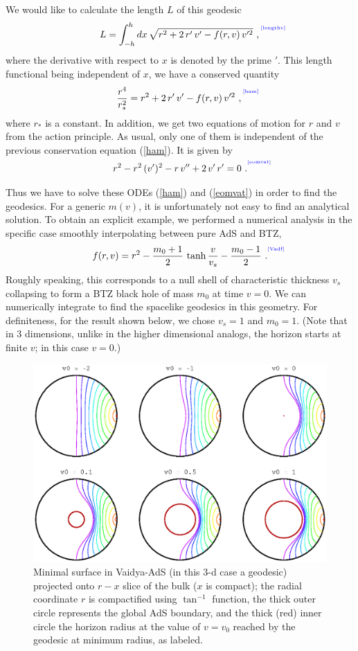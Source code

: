 \documentclass[12pt]{article}
\newcommand{\be}{\begin{equation}}
\newcommand{\ee}{\end{equation}}
\def\req#1{(\ref{#1})}
\def\s{\sigma}
\def\f#1#2{{\frac{#1}{#2}}}
\def\f#1#2{{\frac{#1}{#2}}}
\def\Label#1{\label{#1}%
{ \color{blue}{\smash{\hbox to0pt{\raise2ex\hbox{\tiny[#1]}\hss}}}}}
\def\s{\sqrt}
\def\f {\frac}
\begin{document}
We would like to calculate the length $L$ of this geodesic
%
\be
L=\int^{h}_{-h} dx \,\s{r^2+2\,r'\,v'-f(r,v)\, v'^2}
\ ,
\Label{lengthv} \ee
%
where the derivative with respect to $x$ is denoted by the prime $'$. This length functional being independent of $x$, we have a conserved quantity
%
\be \f{r^4}{r_*^2}=r^2+2\, r'\, v'-f(r,v)\, v'^2\ , \Label{ham}\ee
%
where $r_*$ is a constant.
In addition, we get two equations of motion for $r$ and $v$  from
the action principle. As usual, only one of them is independent of
the previous conservation equation \req{ham}. It is given by
%
\be
r^2-r^2\, (v')^2-r\, v''+2\, v'\, r'=0\ .  \Label{eomvat} \ee
%

Thus we have to solve these ODEs (\ref{ham}) and (\ref{eomvat}) in
order to find the geodesics. For a generic $m(v)$, it is unfortunately not easy to
find an analytical solution. To obtain an explicit example, we
performed a numerical analysis in the specific case smoothly interpolating between pure AdS and BTZ,
%
\be f(r,v) = r^2 - {m_0+1 \over 2} \, \tanh{v \over v_s} - {m_0-1
\over 2} \ . \Label{Vadf} \ee
%
Roughly speaking, this corresponds to a null shell of characteristic thickness
 $v_s$ collapsing to form a BTZ black hole of mass $m_0$ at time $v=0$.
We can numerically integrate to find the spacelike geodesics in this
geometry.  For definiteness, for the result shown below, we chose
$v_s = 1$ and $m_0=1$.   (Note that in 3 dimensions, unlike in the
higher dimensional analogs, the horizon starts at finite $v$; in
this case $v=0$.)
\begin{figure}[htbp]
\begin{center}
\includegraphics[width=4.5in]{mp_vaidya_geodsA}
\caption{Minimal surface in Vaidya-AdS (in this 3-d case a geodesic)
projected onto $r -  x$ slice of the bulk ($x$ is compact);
the radial coordinate $r$ is compactified using $\tan^{-1}$
function, the thick outer circle represents the global AdS boundary,
and the thick (red) inner circle the horizon radius at the value of
$v = v_0$ reached by the geodesic at minimum radius, as labeled.}
\label{mpvaidyageodsA}
\end{center}
\end{figure}
\end{document}

